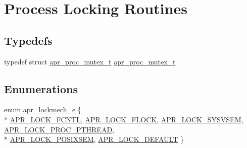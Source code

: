 \hypertarget{group__apr__proc__mutex}{\section{Process Locking Routines}
\label{group__apr__proc__mutex}
}
\subsection*{Typedefs}
\begin{DoxyCompactItemize}
\item 
typedef struct \hyperlink{group__apr__proc__mutex_ga0fae3a1ab686cd1f252c6062e4c97bd2}{apr\-\_\-proc\-\_\-mutex\-\_\-t} \hyperlink{group__apr__proc__mutex_ga0fae3a1ab686cd1f252c6062e4c97bd2}{apr\-\_\-proc\-\_\-mutex\-\_\-t}
\end{DoxyCompactItemize}
\subsection*{Enumerations}
\begin{DoxyCompactItemize}
\item 
enum \hyperlink{group__apr__proc__mutex_ga75dd95a48a1e855a87b509b522746ed4}{apr\-\_\-lockmech\-\_\-e} \{ \\*
\hyperlink{group__apr__proc__mutex_gga75dd95a48a1e855a87b509b522746ed4ad9dad69d83d1e112054ad21a7e4e16b3}{A\-P\-R\-\_\-\-L\-O\-C\-K\-\_\-\-F\-C\-N\-T\-L}, 
\hyperlink{group__apr__proc__mutex_gga75dd95a48a1e855a87b509b522746ed4a1d06f73a37dae31233299401c9594b41}{A\-P\-R\-\_\-\-L\-O\-C\-K\-\_\-\-F\-L\-O\-C\-K}, 
\hyperlink{group__apr__proc__mutex_gga75dd95a48a1e855a87b509b522746ed4a642536695bd4c233761a15d48b1d6487}{A\-P\-R\-\_\-\-L\-O\-C\-K\-\_\-\-S\-Y\-S\-V\-S\-E\-M}, 
\hyperlink{group__apr__proc__mutex_gga75dd95a48a1e855a87b509b522746ed4abd5e7cca2c9f6023b541131f3841057a}{A\-P\-R\-\_\-\-L\-O\-C\-K\-\_\-\-P\-R\-O\-C\-\_\-\-P\-T\-H\-R\-E\-A\-D}, 
\\*
\hyperlink{group__apr__proc__mutex_gga75dd95a48a1e855a87b509b522746ed4a6d65d9d745e13d8759bd8f1057f27041}{A\-P\-R\-\_\-\-L\-O\-C\-K\-\_\-\-P\-O\-S\-I\-X\-S\-E\-M}, 
\hyperlink{group__apr__proc__mutex_gga75dd95a48a1e855a87b509b522746ed4ae91fb435c45216bcf84f506db99d0f19}{A\-P\-R\-\_\-\-L\-O\-C\-K\-\_\-\-D\-E\-F\-A\-U\-L\-T}
 \}
\end{DoxyCompactItemize}
